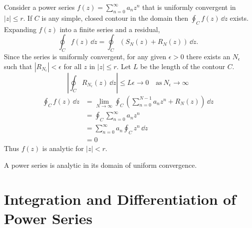 Consider a power series $f(z) = \sum_{n = 0}^\infty a_n z^n$ that is uniformly
convergent in $|z| \leq r$.  If $C$ is any simple, closed contour in the
domain then $\oint_C f(z)\,\dd z$ exists.  Expanding $f(z)$ into a finite
series and a residual,
\[ 
\oint_C f(z)\,\dd z = \oint_C \left( S_N(z) + R_N(z) \right)\,\dd z.
\]
Since the series is uniformly convergent, for any given $\epsilon > 0$ there
exists an $N_\epsilon$ such that $|R_{N_\epsilon}| < \epsilon$ for all $z$
in $|z| \leq r$. Let $L$ be the length of the contour $C$.
\[ 
\left| \oint_C R_{N_\epsilon}(z)\,\dd z \right| \leq L \epsilon \to 0 \quad \mathrm{as}\ N_\epsilon \to \infty
\]
\begin{align*}
  \oint_C f(z)\,\dd z
  &=\lim_{N \to \infty} \oint_C \left( \sum_{n=0}^{N-1} a_n z^n + R_N(z) \right)\,\dd z 
  \\
  &= \oint_C \sum_{n = 0}^\infty a_n z^n 
  \\
  &= \sum_{n = 0}^\infty a_n \oint_C z^n\,\dd z 
  \\
  &= 0
\end{align*}
Thus $f(z)$ is analytic for $|z| < r$.



\begin{Result}
  A power series is analytic in its domain of uniform convergence.
\end{Result}








\section{Integration and Differentiation of Power Series}



